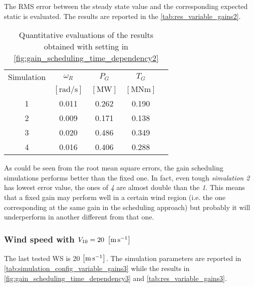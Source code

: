 The \acrshort{RMS} error between the steady state value and the corresponding expected static is evaluated. The results are reported in the \autoref{tab:res_variable_gains2}.
\begin{table}[htb]
  \caption{Quantitative evaluations of the results obtained with setting in \autoref{fig:gain_scheduling_time_dependency2}}
  \centering
  \begin{tabular}{ccccc}
  \toprule
    Simulation & $\omega_R$  & $P_G$ & $T_G$ \\ 
     & $\left[\si{\radian\per\second}\right]$ & $\left[\si{\mega\watt}\right]$ &$\left[\si{\mega\newton\meter}\right]$ \\ \midrule       
     1 & 0.011 & 0.262 & 0.190 \\
     2 & 0.009 & 0.171 & 0.138 \\
     3 & 0.020 & 0.486 & 0.349 \\
     4 & 0.016 & 0.406 & 0.288 \\
     \bottomrule
  \end{tabular}
  \label{tab:res_variable_gains2}
\end{table}

As could be seen from the root mean square errors, the gain scheduling simulations performs better than the fixed one. In fact, even tough \textit{simulation 2} has lowest error value, the ones of \textit{4} are almost double than the \textit{1}. This means that a fixed gain may perform well in a certain wind region (i.e. the one corresponding at the same gain in the scheduling approach) but probably it will underperform in another different from that one.  

\subsubsection{Wind speed with $V_{10} =  20 \ \mesunt{\meter\per\second}$}
The last tested \acrshort{WS} is 20 $\left[\si{\meter\per\second}\right]$. The simulation parameters are reported in \autoref{tab:simulation_config_variable_gains3} while the results in \autoref{fig:gain_scheduling_time_dependency3} and \autoref{tab:res_variable_gains3}.

